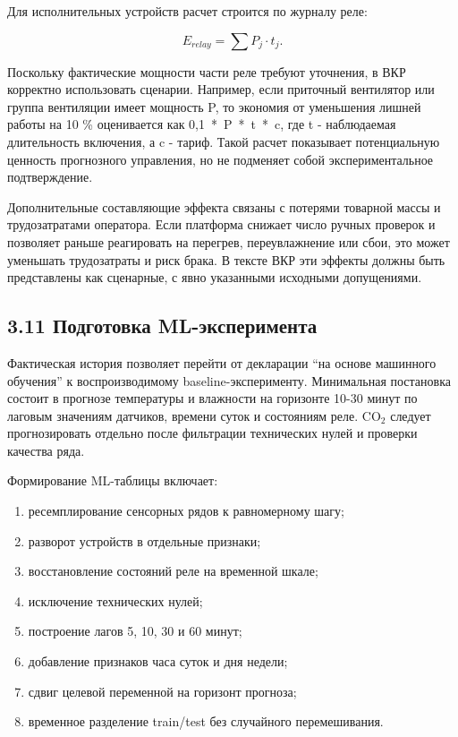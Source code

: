 \documentclass[a4paper,14pt]{extarticle}
\renewcommand{\texttt}[1]{\textnormal{#1}}
\providecommand{\tightlist}{%
  \setlength{\itemsep}{0pt}\setlength{\parskip}{0pt}}
\begin{document}
Для исполнительных устройств расчет строится по журналу реле:

\[
E_{relay} = \sum P_j \cdot t_j.
\]

Поскольку фактические мощности части реле требуют уточнения, в ВКР
корректно использовать сценарии. Например, если приточный вентилятор или
группа вентиляции имеет мощность \texttt{P}, то экономия от уменьшения
лишней работы на 10 \% оценивается как \texttt{0,1\ *\ P\ *\ t\ *\ c},
где \texttt{t} - наблюдаемая длительность включения, а \texttt{c} -
тариф. Такой расчет показывает потенциальную ценность прогнозного
управления, но не подменяет собой экспериментальное подтверждение.

Дополнительные составляющие эффекта связаны с потерями товарной массы и
трудозатратами оператора. Если платформа снижает число ручных проверок и
позволяет раньше реагировать на перегрев, переувлажнение или сбои, это
может уменьшать трудозатраты и риск брака. В тексте ВКР эти эффекты
должны быть представлены как сценарные, с явно указанными исходными
допущениями.

\subsection{3.11 Подготовка
ML-эксперимента}\label{ux43fux43eux434ux433ux43eux442ux43eux432ux43aux430-ml-ux44dux43aux441ux43fux435ux440ux438ux43cux435ux43dux442ux430}

Фактическая история позволяет перейти от декларации ``на основе
машинного обучения'' к воспроизводимому baseline-эксперименту.
Минимальная постановка состоит в прогнозе температуры и влажности на
горизонте 10-30 минут по лаговым значениям датчиков, времени суток и
состояниям реле. CO\(_2\) следует прогнозировать отдельно после
фильтрации технических нулей и проверки качества ряда.

Формирование ML-таблицы включает:

\begin{enumerate}
\def\labelenumi{\arabic{enumi})}
\tightlist
\item
  ресемплирование сенсорных рядов к равномерному шагу;
\item
  разворот устройств в отдельные признаки;
\item
  восстановление состояний реле на временной шкале;
\item
  исключение технических нулей;
\item
  построение лагов 5, 10, 30 и 60 минут;
\item
  добавление признаков часа суток и дня недели;
\item
  сдвиг целевой переменной на горизонт прогноза;
\item
  временное разделение train/test без случайного перемешивания.
\end{enumerate}
\end{document}
